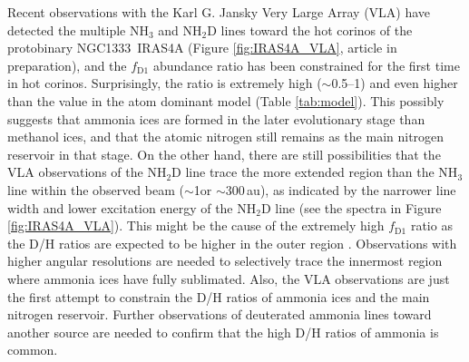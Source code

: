 \documentclass[12pt,a4paper]{article}  %
\newcommand{\ammonia}{NH$_3$\xspace}
\begin{document}
\smallskip
\noindent Recent observations with the Karl G. Jansky Very Large Array (VLA) have detected the multiple \ammonia and NH$_2$D lines toward the hot corinos of the protobinary NGC1333~IRAS4A (Figure \ref{fig:IRAS4A_VLA}, article in preparation), and the $f_\mathrm{D1}$ abundance ratio has been constrained for the first time in hot corinos. Surprisingly, the ratio is extremely high ($\sim$0.5--1) and even higher than the value in the atom dominant model (Table \ref{tab:model}). This possibly suggests that ammonia ices are formed in the later evolutionary stage than methanol ices, and that the atomic nitrogen still remains as the main nitrogen reservoir in that stage. On the other hand, there are still possibilities that the VLA observations of the NH$_2$D line trace the more extended region than the NH$_3$ line within the observed beam ($\sim$1\arcsec or $\sim$300\,au), as indicated by the narrower line width and lower excitation energy of the NH$_2$D line (see the spectra in Figure \ref{fig:IRAS4A_VLA}). This might be the cause of the extremely high $f_\mathrm{D1}$ ratio as the D/H ratios are expected to be higher in the outer region \citep{Furuya18}. Observations with higher angular resolutions are needed to selectively trace the innermost region where ammonia ices have fully sublimated. Also, the VLA observations are just the first attempt to constrain the D/H ratios of ammonia ices and the main nitrogen reservoir. Further observations of deuterated ammonia lines toward another source are needed to confirm that the high D/H ratios of ammonia is common. 





\end{document}
